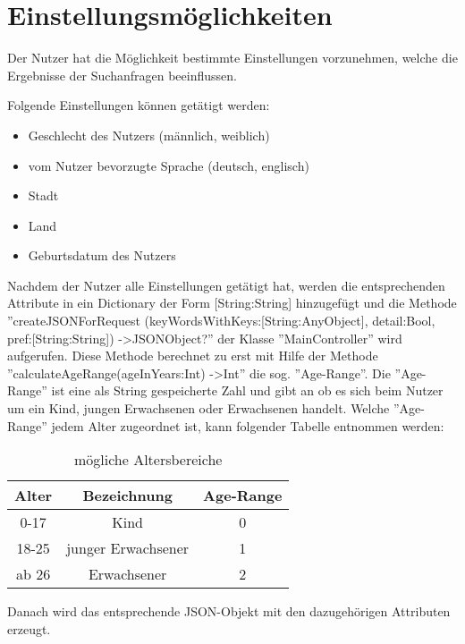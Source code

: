 
\chapter{Einstellungsmöglichkeiten}

Der Nutzer hat die Möglichkeit bestimmte Einstellungen vorzunehmen, welche die Ergebnisse der Suchanfragen beeinflussen.   

Folgende Einstellungen können getätigt werden:

\begin{itemize}
	\item Geschlecht des Nutzers (männlich, weiblich)
	\item vom Nutzer bevorzugte Sprache (deutsch, englisch)
	\item Stadt
	\item Land
	\item Geburtsdatum des Nutzers
\end{itemize}


Nachdem der Nutzer alle Einstellungen getätigt hat, werden die entsprechenden Attribute in
ein Dictionary der Form [String:String] hinzugefügt und die Methode ''createJSONForRequest
(keyWordsWithKeys:[String:AnyObject],
detail:Bool, pref:[String:String]) -\textgreater JSONObject?'' der Klasse ''MainController'' wird aufgerufen. Diese Methode berechnet zu erst mit Hilfe der Methode ''calculateAgeRange(ageInYears:Int) -\textgreater Int'' die sog. ''Age-Range''. Die ''Age-Range'' ist eine als String gespeicherte Zahl und gibt an ob es sich beim Nutzer um ein Kind, jungen Erwachsenen oder Erwachsenen handelt. Welche ''Age-Range'' jedem Alter zugeordnet ist, kann folgender Tabelle entnommen werden:

\begin{table}
	\centering
	\begin{tabular}{c|c|c}
		Alter & Bezeichnung & Age-Range \\
		\hline
		0-17 & Kind & 0 \\
		18-25 & junger Erwachsener & 1 \\
		ab 26 & Erwachsener & 2
	\end{tabular}
	\caption{mögliche Altersbereiche}
	\label{tab:Altersbereiche}
\end{table}
\pagebreak
Danach wird das entsprechende JSON-Objekt mit den dazugehörigen Attributen erzeugt.

